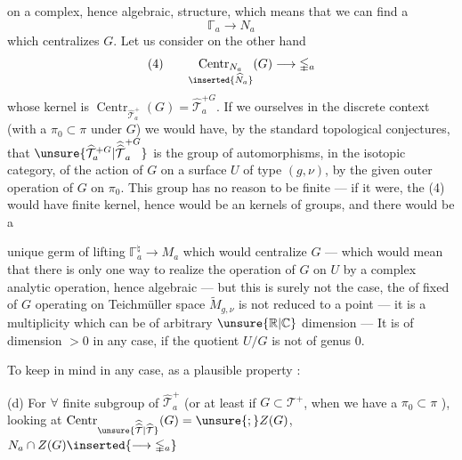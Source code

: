 
on a complex, hence algebraic, structure, which means that we can find a  
\[
\mathbb{\Gamma}_a\longrightarrow N_a
\]
which centralizes $G$. Let us consider on the other hand
\[
(4)\qquad
\underset{\inserted{\widehat N_a}}{\operatorname{Centr}_{N_a}}(G)
\longrightarrow\mathbb{\Gamma}_a
\]
whose kernel is $\operatorname{Centr}_{\widehat{\mathcal T}_a^+}(G)=\widehat{\mathcal T}_a^{+G}$.
If we  ourselves in the discrete context  (with a  $\pi_0\subset\pi$  under $G$) we would have, by the standard topological conjectures, that $\unsure{\widehat{\mathcal T}_a^{+G}|\widehat{\widehat{\mathcal T}}_a^{+G}}$ is the group of automorphisms, in the isotopic category, of the action of $G$ on a surface $U$ of type $(g,\nu)$,  by the given outer operation of $G$ on $\pi_0$. This group has no reason to be finite --- if it were, the  (4) would have finite kernel, hence would be an   kernels of groups, and there would be a


unique germ of lifting $\mathbb{\Gamma}_a^{\natural}\longrightarrow M_a$ which would centralize $G$ --- which would mean that there is  only one way to realize the  operation of $G$ on $U$ by a  complex analytic operation, hence algebraic --- but this is surely not the case, the  of fixed  of $G$ operating on Teichmüller space $\widetilde M_{g,\nu}$ is not reduced to a point --- it is  a  multiplicity which can be  of arbitrary $\unsure{\mathbb R|\mathbb C}$ dimension --- It is of dimension $>0$ in any case, if the quotient  $U/G$ is not of genus $0$.

To keep in mind in any case, as a plausible property :

(d) For $\forall$ finite subgroup  of $\widehat{\mathcal T}_a^+$ (or at least if $G\subset\mathcal T^+$, when we have a  $\pi_0\subset\pi$ ), looking at $\operatorname{Centr}_{\unsure{\widehat{\widehat{\mathcal T}}|\widehat{\mathcal T}}}(G)=\unsure{;}Z(G)$, $N_a\cap Z(G)\inserted{\longrightarrow\mathbb{\Gamma}_a}$  

